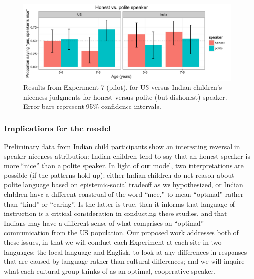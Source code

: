 \begin{figure}[t]
\begin{centering}
\includegraphics[width=\textwidth]{figures/exp4.pdf}
\caption{\label{fig:expt4} Results from Experiment 7 (pilot), for US versus Indian children's niceness judgments for honest versus polite (but dishonest) speaker. Error bars represent 95\% confidence intervals.}
\end{centering}
\end{figure}

\subsubsection{Implications for the model}

Preliminary data from Indian child participants show an interesting reversal in speaker niceness attribution: Indian children tend to say that an honest speaker is more ``nice'' than a polite speaker. In light of our model, two interpretations are possible (if the patterns hold up): either Indian children do not reason about polite language based on epistemic-social tradeoff as we hypothesized, or Indian children have a different construal of the word ``nice,'' to mean ``optimal'' rather than ``kind'' or ``caring''. Is the latter is true, then it informs that language of instruction is a critical consideration in conducting these studies, and that Indians may have a different sense of what comprises an ``optimal'' communication from the US population. Our proposed work addresses both of these issues, in that we will conduct each Experiment at each site in two languages: the local language and English, to look at any differences in responses that are caused by language rather than cultural differences; and we will inquire what each cultural group thinks of as an optimal, cooperative speaker.



